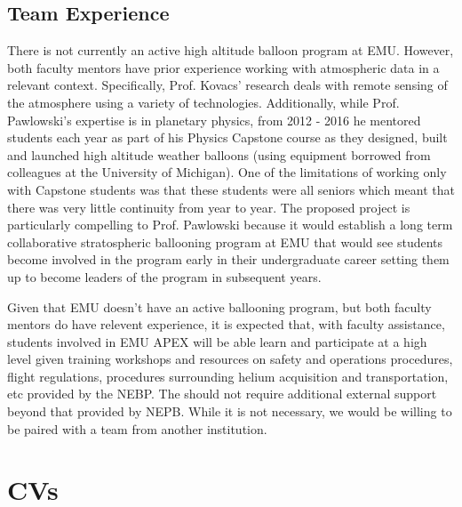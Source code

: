 \documentclass[12pt]{article}
\begin{document}
\subsection{Team Experience}
There is not currently an active high altitude balloon program at EMU. However, both faculty mentors have
prior experience working with atmospheric data in a relevant context. Specifically,
Prof. Kovacs' research deals with remote sensing of the atmosphere using a variety of technologies.
Additionally, while Prof. Pawlowski's expertise is in planetary physics, from 2012 - 2016 he
mentored students each year as part of his Physics
Capstone course as they designed, built and launched high altitude weather balloons (using
equipment borrowed from colleagues at the University of Michigan). One of the
limitations of working only with Capstone students
was that these students were all seniors which meant that there was very little continuity from year to year.
The proposed project is particularly compelling to Prof. Pawlowski
because it would establish a long term collaborative
stratospheric ballooning program at EMU that would see students become involved in the program
early in their undergraduate career setting them up to become leaders of the program in subsequent years.

Given that EMU doesn't have an active ballooning program, but both faculty mentors
do have relevent experience, it is expected that, with faculty assistance, students involved in EMU APEX will be able learn
and participate at a high level given training workshops and resources on safety and operations procedures, flight regulations,
procedures surrounding helium acquisition and transportation, etc provided by the NEBP.
The should not require additional external support beyond that provided by NEPB.
While it is not necessary, we would be willing to be paired with a team from
another institution.



\newpage
\section{CVs}



\newpage
\end{document}
